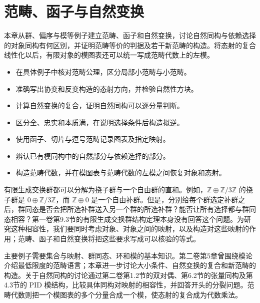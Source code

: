 
\chapter{范畴、函子与自然变换}
\label{b4:ch:01}

\begin{chapterabstract}
	本章从群、偏序与模等例子建立范畴、函子和自然变换，讨论自然同构与依赖选择的对象同构有何区别，并证明范畴等价的判据及若干新范畴的构造。将态射的复合线性化以后，有限对象的模图表还可以统一写成范畴代数上的左模。
\end{chapterabstract}

\begin{learninggoals}
	\begin{itemize}
		\item 在具体例子中核对范畴公理，区分局部小范畴与小范畴。
		\item 准确写出协变和反变构造的态射方向，并检验自然性方块。
		\item 计算自然变换的复合，证明自然同构可以逐分量判断。
		\item 区分全、忠实和本质满，在说明选择条件后构造拟逆。
		\item 使用函子、切片与逗号范畴记录图表及指定映射。
		\item 辨认已有模同构中的自然部分与依赖选择的部分。
		\item 构造范畴代数，并在模图表与范畴代数的左模之间恢复对象和态射。
	\end{itemize}
\end{learninggoals}

有限生成交换群都可以分解为挠子群与一个自由群的直和。例如，\(\mathbb Z\oplus\mathbb Z/3\mathbb Z\) 的挠子群是 \(0\oplus\mathbb Z/3\mathbb Z\)，而 \(\mathbb Z\oplus0\) 是一个自由补群。但是，分别给每个群选定补群之后，群同态是否会把所选补群送入另一个群的所选补群？能否让所有选择都与群同态相容？第一卷第9.3节的有限生成交换群结构定理本身没有回答这个问题。为研究这种相容性，我们要同时考虑对象、对象之间的映射，以及构造对这些映射的作用；范畴、函子和自然变换将把这些要求写成可以核验的等式。

\ProseParagraphBreak
主要例子需要集合与映射、群同态、环和模的基本知识。第二卷第5章曾围绕模论介绍最低限度的范畴语言；本章进一步讨论大小条件、自然变换的复合和新范畴的构造。关于自然同构的讨论通过第二卷第1.2节的双对偶、第6.2节的张量同构及第4.3节的 PID 模结构，比较具体同构对映射的相容性，并回答开头的分裂问题。范畴代数则把一个模图表的多个分量合成一个模，使态射的复合成为代数乘法。

